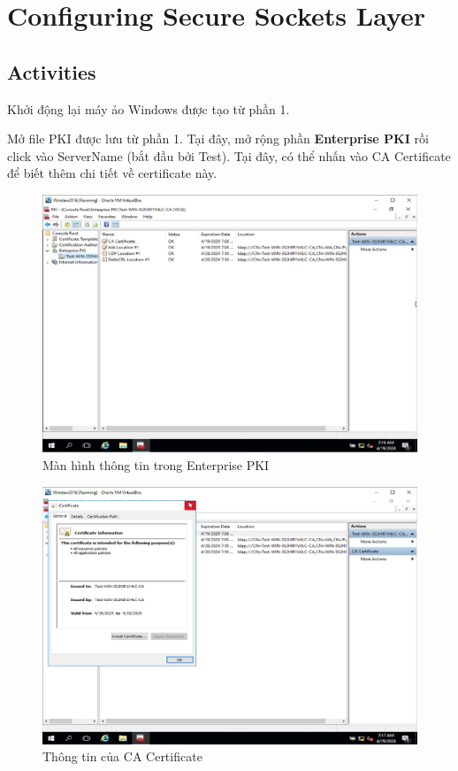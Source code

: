\newpage
\section{Configuring Secure Sockets Layer}
\subsection{Activities}
 Khởi động lại máy ảo Windows được tạo từ phần 1. 

 Mở file PKI được lưu từ phần 1. Tại đây, mở rộng phần \textbf{Enterprise PKI} rồi click vào ServerName (bắt đầu bởi Test). Tại đây, có thể nhấn vào CA Certificate để biết thêm chi tiết về certificate này.

\begin{figure}[!htb]
    \centering
    \includegraphics[width=0.8\linewidth]{figure//chapter4//lab4_1/ca_cert.png}
    \caption{Màn hình thông tin trong Enterprise PKI}
    \label{fig:enter-label}
\end{figure}

\begin{figure}[!htb]
    \centering
    \includegraphics[width=0.8\linewidth]{figure//chapter4//lab4_2/ca_cert_info.png}
    \caption{Thông tin của CA Certificate}
    \label{fig:enter-label}
\end{figure}


